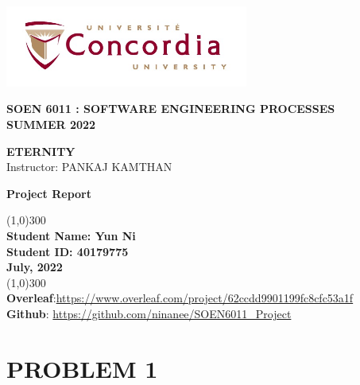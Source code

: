 \documentclass[11pt]{article}
\begin{document}
\begin{titlepage}
\begin{center}
    \includegraphics[width=8cm]{images/logo.jpg}
\end{center}

\begin{center}
\begin{Large}
\textbf{SOEN 6011 : SOFTWARE ENGINEERING PROCESSES} \\
\vspace*{0.1in}
\textbf{SUMMER 2022}\\
\vspace*{0.9in}
\end{Large}
\begin{Large}
\textbf{ETERNITY}\\
\vspace*{0.1in}
Instructor: PANKAJ KAMTHAN \\
\vspace*{0.9in}
\begin{Huge}
\textbf{Project Report}\\
\vspace*{0.9in}
\end{Huge}
\end{Large}

\begin{center}
    \line(1,0){300}\\
    \textbf{Student Name: Yun Ni\\
    Student ID: 40179775}\\
    \textbf{July, 2022}\\
    \line(1,0){300}\\
    \vspace*{0.5in}
    \textbf{Overleaf}:\url{https://www.overleaf.com/project/62ccdd9901199fc8cfc53a1f} \\
    \textbf{Github}: \url{https://github.com/ninanee/SOEN6011_Project} 
\end{center}
\end{center}

\end{titlepage}

\newpage
\section{PROBLEM 1}\label{problem1}
\end{document}
